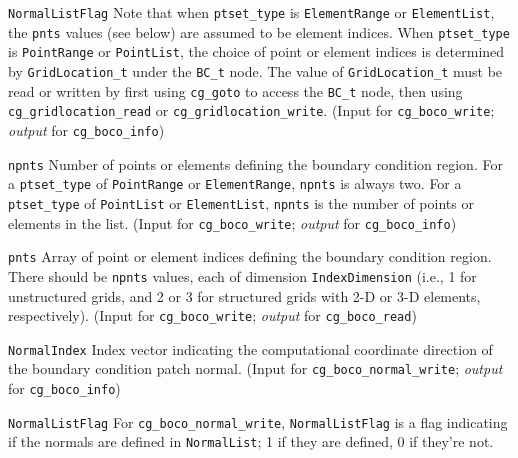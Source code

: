 \begin{Ventryi}{\texttt{NormalListFlag}}
      Note that when \texttt{ptset\_type} is \texttt{ElementRange} or
      \texttt{ElementList}, the \texttt{pnts} values (see below) are assumed
      to be element indices.
      When \texttt{ptset\_type} is \texttt{PointRange} or \texttt{PointList},
      the choice of point or element indices is determined by
      \texttt{GridLocation\_t} under the \texttt{BC\_t} node.
      The value of \texttt{GridLocation\_t} must be read or
      written by first using \texttt{cg\_goto} to access the
      \texttt{BC\_t} node, then using \texttt{cg\_gridlocation\_read} or
      \texttt{cg\_gridlocation\_write}.
      (\textcolor{input}{Input} for \texttt{cg\_boco\_write};
      \textcolor{output}{\textit{output}} for \texttt{cg\_boco\_info})
\item [\texttt{npnts}]
      Number of points or elements defining the boundary
      condition region.
      For a \texttt{ptset\_type} of \texttt{PointRange} or \texttt{ElementRange},
      \texttt{npnts} is always two.
      For a \texttt{ptset\_type} of \texttt{PointList} or \texttt{ElementList},
      \texttt{npnts} is the number of points or elements in the list.
      (\textcolor{input}{Input} for \texttt{cg\_boco\_write};
      \textcolor{output}{\textit{output}} for \texttt{cg\_boco\_info})
\item [\texttt{pnts}]
      Array of point or element indices defining the boundary condition
      region.
      There should be \texttt{npnts} values, each of dimension
      \texttt{IndexDimension} (i.e., 1 for unstructured grids,
      and 2 or 3 for structured grids with 2-D or 3-D elements,
      respectively).
      (\textcolor{input}{Input} for \texttt{cg\_boco\_write};
      \textcolor{output}{\textit{output}} for \texttt{cg\_boco\_read})
\item [\texttt{NormalIndex}]
      Index vector indicating the computational coordinate direction
      of the boundary condition patch normal.
      (\textcolor{input}{Input} for \texttt{cg\_boco\_normal\_write};
      \textcolor{output}{\textit{output}} for \texttt{cg\_boco\_info})
\item [\texttt{NormalListFlag}]
      For \texttt{cg\_boco\_normal\_write}, \texttt{NormalListFlag} is a
      flag indicating if the normals are defined in \texttt{NormalList};
      1 if they are defined, 0 if they're not.


\end{Ventryi}
